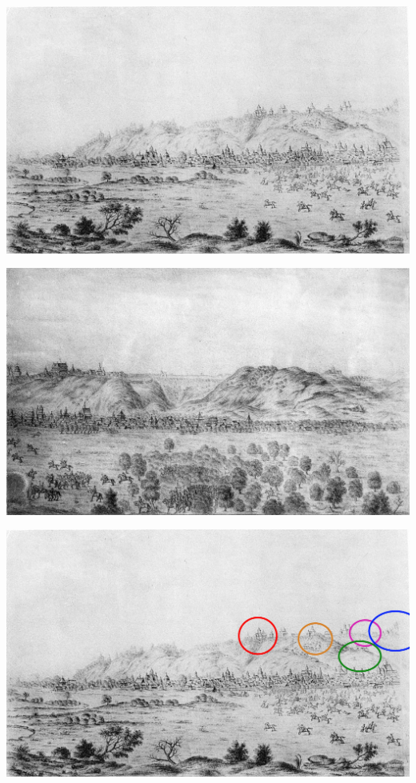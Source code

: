 \vspace*{\fill}
\begin{center}
\includegraphics[width=\linewidth]{chast-colebanie-osnov/gora-zamkovaya-valovaya/tabl03-1.jpg}
\end{center}

\begin{center}
\includegraphics[width=\linewidth]{chast-colebanie-osnov/gora-zamkovaya-valovaya/tabl03-2.jpg}
\end{center}
\vspace*{\fill}
\newpage

\begin{center}
\includegraphics[width=\linewidth]{chast-colebanie-osnov/gora-zamkovaya-valovaya/tabl03-1-marked.jpg}
\end{center}

